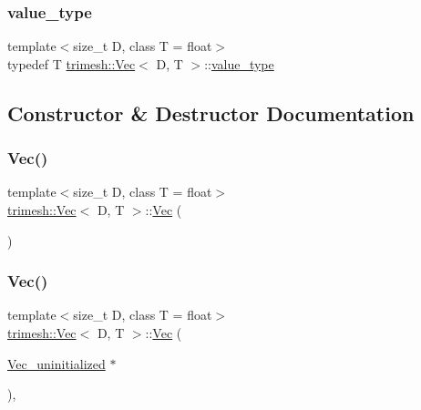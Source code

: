 \mbox{\label{classtrimesh_1_1Vec_a10a59253996e42d67c713f37592669df}} 
\subsubsection{\texorpdfstring{value\+\_\+type}{value\_type}}
{\footnotesize\ttfamily template$<$size\+\_\+t D, class T = float$>$ \\
typedef T \hyperlink{classtrimesh_1_1Vec}{trimesh\+::\+Vec}$<$ D, T $>$\+::\hyperlink{classtrimesh_1_1Vec_a10a59253996e42d67c713f37592669df}{value\+\_\+type}}



\subsection{Constructor \& Destructor Documentation}
\mbox{\label{classtrimesh_1_1Vec_ab50b05513a3d69de47888f9cbe87a9a1}} 
\subsubsection{\texorpdfstring{Vec()}{Vec()}\hspace{0.1cm}{\footnotesize\ttfamily [1/7]}}
{\footnotesize\ttfamily template$<$size\+\_\+t D, class T = float$>$ \\
\hyperlink{classtrimesh_1_1Vec}{trimesh\+::\+Vec}$<$ D, T $>$\+::\hyperlink{classtrimesh_1_1Vec}{Vec} (\begin{DoxyParamCaption}{ }\end{DoxyParamCaption})\hspace{0.3cm}{\ttfamily [inline]}}

\mbox{\label{classtrimesh_1_1Vec_a6be5186cdbc95a77bbebc22a7efc9273}} 
\subsubsection{\texorpdfstring{Vec()}{Vec()}\hspace{0.1cm}{\footnotesize\ttfamily [2/7]}}
{\footnotesize\ttfamily template$<$size\+\_\+t D, class T = float$>$ \\
\hyperlink{classtrimesh_1_1Vec}{trimesh\+::\+Vec}$<$ D, T $>$\+::\hyperlink{classtrimesh_1_1Vec}{Vec} (\begin{DoxyParamCaption}\item[{\hyperlink{structtrimesh_1_1Vec__uninitialized}{Vec\+\_\+uninitialized} $\ast$}]{ }\end{DoxyParamCaption})\hspace{0.3cm}{\ttfamily [inline]}, {\ttfamily [explicit]}}

